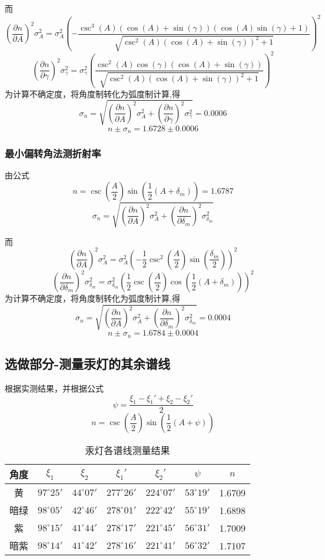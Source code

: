\documentclass{ctexart}
\begin{document}
  而
  $$(\frac{\partial n}{\partial A})^2\sigma_A^2=\sigma_A^2(-\frac{\csc ^3(A) (\cos (A)+\sin (\gamma)) (\cos (A) \sin (\gamma)+1)}{\sqrt{\csc ^2(A) (\cos (A)+\sin (\gamma))^2+1}})^2$$
  $$(\frac{\partial n}{\partial \gamma})^2\sigma_{\gamma}^2=\sigma_{\gamma}^2(\frac{\csc ^2(A) \cos (\gamma ) (\cos (A)+\sin (\gamma ))}{\sqrt{\csc ^2(A) (\cos (A)+\sin (\gamma ))^2+1}})^2$$
  为计算不确定度，将角度制转化为弧度制计算,得$$\sigma_n=\sqrt{(\frac{\partial n}{\partial A})^2\sigma_A^2+(\frac{\partial n}{\partial \gamma})^2\sigma_{\gamma}^2}=0.0006$$
  $$n\pm \sigma_n=1.6728\pm 0.0006$$
  \subsubsection{最小偏转角法测折射率}
  由公式$$n=\csc \left(\frac{A}{2}\right) \sin \left(\frac{1}{2} \left(A+\delta _m\right)\right)=1.6787$$
  $$\sigma_n=\sqrt{(\frac{\partial n}{\partial A})^2\sigma_A^2+(\frac{\partial n}{\partial \delta_m})^2\sigma_{\delta_m}^2}$$
  
  而$$(\frac{\partial n}{\partial A})^2\sigma_A^2=\sigma_A^2(-\frac{1}{2} \csc ^2\left(\frac{A}{2}\right) \sin \left(\frac{\delta _m}{2}\right))^2$$
  $$(\frac{\partial n}{\partial \delta_m})^2\sigma_{\delta_m}^2=\sigma_{\delta_m}^2(\frac{1}{2} \csc \left(\frac{A}{2}\right) \cos \left(\frac{1}{2} \left(A+\delta _m\right)\right))^2$$
  为计算不确定度，将角度制转化为弧度制计算,得$$\sigma_n=\sqrt{(\frac{\partial n}{\partial A})^2\sigma_A^2+(\frac{\partial n}{\partial \delta_m})^2\sigma_{\delta_m}^2}=0.0004$$
  $$n\pm \sigma_n=1.6784\pm 0.0004$$
  \subsection{选做部分-测量汞灯的其余谱线}
  根据实测结果，并根据公式$$\psi=\frac{\xi_1-\xi_1'+\xi_2-\xi_2'}{2}$$
  $$n=\csc \left(\frac{A}{2}\right) \sin \left(\frac{1}{2} \left(A+\psi\right)\right)$$
  
\begin{table}[htbp]
  \centering
  \caption{汞灯各谱线测量结果}
    \begin{tabular}{|c|c|c|c|c|c|c|}\hline
    角度    & {$\xi_1$} & {$\xi_2$} & {$\xi_1'$} & {$\xi_2'$} & {$\psi$} & {$n$} \\\hline
    黄     & $97^\circ 25'$ & $44^\circ 07'$ & $277^\circ 26'$ & $224^\circ 07'$ & $53^\circ 19'$ & 1.6709 \\\hline
    暗绿    & $98^\circ 05'$ & $42^\circ 46'$ & $278^\circ 01'$ & $222^\circ 42'$ & $55^\circ 19'$ & 1.6898 \\\hline
    紫     & $98^\circ 15'$ & $41^\circ 44'$ & $278^\circ 17'$ & $221^\circ 45'$ & $56^\circ 31'$ & 1.7009 \\\hline
    暗紫    & $98^\circ 14'$ & $41^\circ 42'$ & $278^\circ 16'$ & $221^\circ 41'$ & $56^\circ 32'$ & 1.7107 \\\hline
    \end{tabular}%
  \label{tab:addlabel}%
\end{table}%
\end{document}
